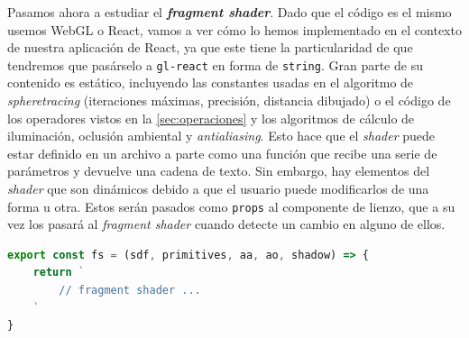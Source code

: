 

Pasamos ahora a estudiar el \textbf{\textit{fragment shader}}. Dado que el código es el mismo usemos WebGL o React, vamos a ver cómo lo hemos implementado en el contexto de nuestra aplicación de React, ya que este tiene la particularidad de que tendremos que pasárselo a \texttt{gl-react} en forma de \texttt{string}. Gran parte de su contenido es estático, incluyendo las constantes usadas en el algoritmo de \textit{spheretracing} (iteraciones máximas, precisión, distancia dibujado) o el código de los operadores vistos en la \autoref{sec:operaciones} y los algoritmos de cálculo de iluminación, oclusión ambiental y \textit{antialiasing}. Esto hace que el \textit{shader} puede estar definido en un archivo a parte como una función que recibe una serie de parámetros y devuelve una cadena de texto. Sin embargo, hay elementos del \textit{shader} que son dinámicos debido a que el usuario puede modificarlos de una forma u otra. Estos serán pasados como \texttt{props} al componente de lienzo, que a su vez los pasará al \textit{fragment shader} cuando detecte un cambio en alguno de ellos.
\begin{lstlisting}[language=JavaScript, caption=Definición del procesador de fragmentos]
export const fs = (sdf, primitives, aa, ao, shadow) => {
    return `
        // fragment shader ...
    `
}
\end{lstlisting}

